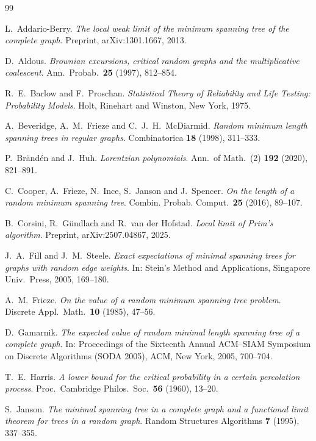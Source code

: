 \documentclass[11pt,a4paper]{amsart}
\theoremstyle{plain}
\theoremstyle{definition}
\theoremstyle{remark}
\begin{document}
\begin{thebibliography}{99}

L.~Addario-Berry.
\emph{The local weak limit of the minimum spanning tree of the complete graph}.
Preprint, arXiv:1301.1667, 2013.

D.~Aldous.
\emph{Brownian excursions, critical random graphs and the multiplicative
coalescent}.
Ann.\ Probab.\ \textbf{25} (1997), 812--854.

R.~E.~Barlow and F.~Proschan.
\emph{Statistical Theory of Reliability and Life Testing: Probability Models}.
Holt, Rinehart and Winston, New York, 1975.

A.~Beveridge, A.~M.~Frieze and C.~J.~H.~McDiarmid.
\emph{Random minimum length spanning trees in regular graphs}.
Combinatorica \textbf{18} (1998), 311--333.

P.~Br\"and\'en and J.~Huh.
\emph{Lorentzian polynomials}.
Ann.\ of Math.\ (2) \textbf{192} (2020), 821--891.

C.~Cooper, A.~Frieze, N.~Ince, S.~Janson and J.~Spencer.
\emph{On the length of a random minimum spanning tree}.
Combin. Probab. Comput.\ \textbf{25} (2016), 89--107.

B.~Corsini, R.~G\"undlach and R.~van der Hofstad.
\emph{Local limit of Prim's algorithm}.
Preprint, arXiv:2507.04867, 2025.

J.~A.~Fill and J.~M.~Steele.
\emph{Exact expectations of minimal spanning trees for graphs with random edge
weights}.
In: Stein's Method and Applications, Singapore Univ.\ Press, 2005, 169--180.

A.~M.~Frieze.
\emph{On the value of a random minimum spanning tree problem}.
Discrete Appl.\ Math.\ \textbf{10} (1985), 47--56.

D.~Gamarnik.
\emph{The expected value of random minimal length spanning tree of a complete
graph}.
In: Proceedings of the Sixteenth Annual ACM--SIAM Symposium on Discrete
Algorithms (SODA 2005), ACM, New York, 2005, 700--704.

T.~E.~Harris.
\emph{A lower bound for the critical probability in a certain percolation
process}.
Proc.\ Cambridge Philos.\ Soc.\ \textbf{56} (1960), 13--20.

S.~Janson.
\emph{The minimal spanning tree in a complete graph and a functional limit
theorem for trees in a random graph}.
Random Structures Algorithms \textbf{7} (1995), 337--355.


\end{thebibliography}
\end{document}
